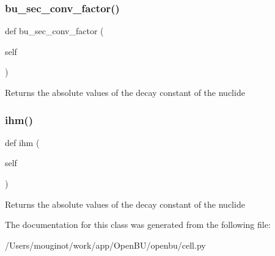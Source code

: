 \subsubsection{\texorpdfstring{bu\+\_\+sec\+\_\+conv\+\_\+factor()}{bu\_sec\_conv\_factor()}}
{\footnotesize\ttfamily def bu\+\_\+sec\+\_\+conv\+\_\+factor (\begin{DoxyParamCaption}\item[{}]{self }\end{DoxyParamCaption})}

\begin{DoxyVerb}Returns the absolute values of the decay constant of the nuclide\end{DoxyVerb}
 \mbox{\label{classopenbu_1_1cell_1_1_cell_a50ae19f4fbadad51e8a4d676c4d9866b}} 
\subsubsection{\texorpdfstring{ihm()}{ihm()}}
{\footnotesize\ttfamily def ihm (\begin{DoxyParamCaption}\item[{}]{self }\end{DoxyParamCaption})}

\begin{DoxyVerb}Returns the absolute values of the decay constant of the nuclide\end{DoxyVerb}
 

The documentation for this class was generated from the following file\+:\begin{DoxyCompactItemize}
\item 
/\+Users/mouginot/work/app/\+Open\+B\+U/openbu/cell.\+py\end{DoxyCompactItemize}
